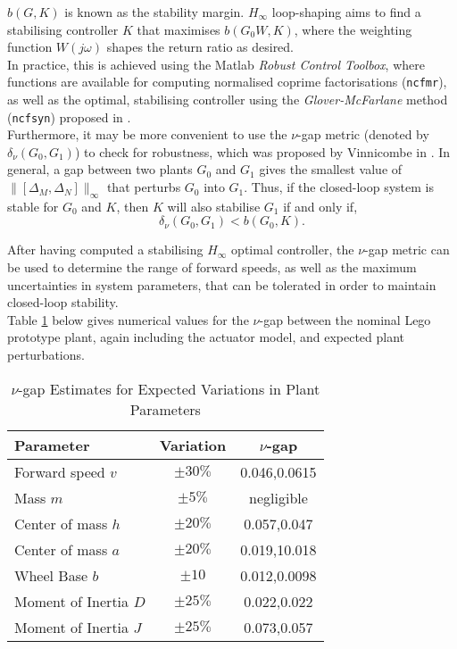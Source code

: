 $b(G,K)$ is known as the stability margin. $H_{\infty}$ loop-shaping aims to find a stabilising controller $K$ that maximises $b(G_0 W,K)$, where the weighting function $W(j\omega)$ shapes the return ratio as desired. \\

In practice, this is achieved using the Matlab \textit{Robust Control Toolbox}, where functions are available for computing normalised coprime factorisations (\texttt{ncfmr}), as well as the optimal, stabilising controller using the \textit{Glover-McFarlane} method (\texttt{ncfsyn}) proposed in \cite{hinf}. \\

Furthermore, it may be more convenient to use the $\nu$-gap metric (denoted by $\delta_{\nu}(G_0,G_1)$) to check for robustness, which was proposed by Vinnicombe in \cite{nugap}. In general, a gap between two plants $G_0$ and $G_1$ gives the smallest value of $\lVert [\Delta_M, \Delta_N] \rVert_{\infty}$ that perturbs $G_0$ into $G_1$. Thus, if the closed-loop system is stable for $G_0$ and $K$, then $K$ will also stabilise $G_1$ if and only if,
\begin{equation*}
\delta_{\nu}(G_0,G_1) < b(G_0,K).
\end{equation*}

After having computed a stabilising $H_{\infty}$ optimal controller, the $\nu$-gap metric can be used to determine the range of forward speeds, as well as the maximum uncertainties in system parameters, that can be tolerated in order to maintain closed-loop stability. \\

Table \ref{table:nugap} below gives numerical values for the $\nu$-gap between the nominal Lego prototype plant, again including the actuator model, and expected plant perturbations.

\begin{table}[H]
	\centering
 	\begin{tabular}[t]{lcc} 
 	\toprule
 	Parameter & Variation & $\nu$-gap\\ 
 	\midrule
 	Forward speed $v$ & $\pm 30\%$ & 0.046,0.0615  \\
 	Mass $m$ & $\pm 5\%$ & negligible \\ 
 	Center of mass $h$ & $\pm 20\%$ & 0.057,0.047 \\
 	Center of mass $a$ & $\pm 20\%$ & 0.019,10.018\\
 	Wheel Base $b$ & $\pm 10$ & 0.012,0.0098\\
 	Moment of Inertia $D$ & $\pm 25\%$ & 0.022,0.022\\
 	Moment of Inertia $J$ & $\pm 25\%$ & 0.073,0.057\\
 	\bottomrule
	\end{tabular}
 	\caption{$\nu$-gap Estimates for Expected Variations in Plant Parameters}
 	\label{table:nugap}
\end{table}


